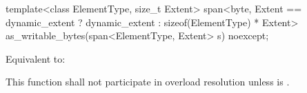 %
\begin{itemdecl}
template<class ElementType, size_t Extent>
  span<byte, Extent == dynamic_extent ? dynamic_extent : sizeof(ElementType) * Extent>
    as_writable_bytes(span<ElementType, Extent> s) noexcept;
\end{itemdecl}
\begin{itemdescr}
\pnum
\effects
Equivalent to: 

\pnum
\remarks
This function shall not participate in overload resolution unless
 is .
\end{itemdescr}
